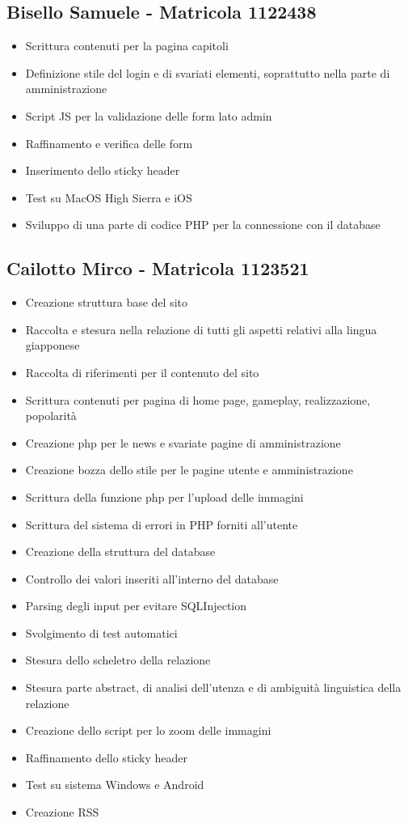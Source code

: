 \documentclass[openany, a4paper, 12pt]{report}
\begin{document}
	\subsection{Bisello Samuele - Matricola 1122438}
	\begin{itemize}
		\item Scrittura contenuti per la pagina capitoli
		\item Definizione stile del login e di svariati elementi, soprattutto nella parte di amministrazione
		\item Script JS per la validazione delle form lato admin
		\item Raffinamento e verifica delle form
		\item Inserimento dello sticky header
		\item Test su MacOS High Sierra e iOS
		\item Sviluppo di una parte di codice PHP per la connessione con il database
	\end{itemize}
	\subsection{Cailotto Mirco - Matricola 1123521}
	\begin{itemize}
		\item Creazione struttura base del sito
		\item Raccolta e stesura nella relazione di tutti gli aspetti relativi alla lingua giapponese
		\item Raccolta di riferimenti per il contenuto del sito
		\item Scrittura contenuti per pagina di home page, gameplay, realizzazione, popolarità
		\item Creazione php per le news e svariate pagine di amministrazione
		\item Creazione bozza dello stile per le pagine utente e amministrazione
		\item Scrittura della funzione php per l'upload delle immagini
		\item Scrittura del sistema di errori in PHP forniti all'utente
		\item Creazione della struttura del database
		\item Controllo dei valori inseriti all'interno del database
		\item Parsing degli input per evitare SQLInjection
		\item Svolgimento di test automatici
		\item Stesura dello scheletro della relazione
		\item Stesura parte abstract, di analisi dell'utenza e di ambiguità linguistica della relazione
		\item Creazione dello script per lo zoom delle immagini
		\item Raffinamento dello sticky header
		\item Test su sistema Windows e Android
		\item Creazione RSS
	\end{itemize}
\end{document}
